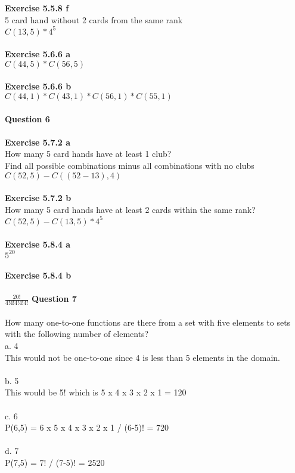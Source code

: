 \documentclass{article}
\begin{document}
\textbf{Exercise 5.5.8 f}\\
5 card hand without 2 cards from the same rank\\
$C(13,5) * 4^5$\\\\
\textbf{Exercise 5.6.6 a}\\
$C(44,5) * C(56,5)$\\\\
\textbf{Exercise 5.6.6 b}\\
$C(44,1) * C(43,1) * C(56,1) * C(55,1)$\\\\
\newpage
\noindent \textbf{Question 6}\\\\
\textbf{Exercise 5.7.2 a}\\
How many 5 card hands have at least 1 club?\\
Find all possible combinations minus all combinations with no clubs\\
$C(52,5) - C((52-13),4)$\\\\
\textbf{Exercise 5.7.2 b}\\
How many 5 card hands have at least 2 cards within the same rank?\\
$C(52,5) - C(13,5)*4^5$\\\\
\textbf{Exercise 5.8.4 a}\\
$5^{20}$\\\\
\textbf{Exercise 5.8.4 b}\\\\
$\frac{20!}{4!4!4!4!4!}$
\newpage
\noindent \textbf{Question 7}\\\\
How many one-to-one functions are there from a set with five elements to sets with the following number of elements?\\
a. 4\\
This would not be one-to-one since 4 is less than 5 elements in the domain.\\\\
b. 5\\
This would be 5! which is 5 x 4 x 3 x 2 x 1 = 120\\\\
c. 6\\
P(6,5) = 6 x 5 x 4 x 3 x 2 x 1 / (6-5)! = 720 \\\\
d. 7\\
P(7,5) = 7! / (7-5)! = 2520
\end{document}
